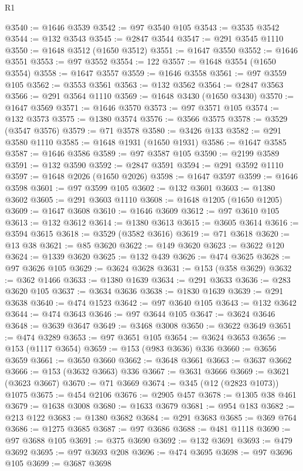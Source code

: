 \begin{lexlean}{R1}
\begin{coremodule}
@3540 := @1646 @3539
@3542 := @97 @3540 @105
@3543 := @3535 @3542
@3544 := @132 @3543
@3545 := @2847 @3544
@3547 := @291 @3545 @1110
@3550 := @1648 @3512 (@1650 @3512)
@3551 := @1647 @3550
@3552 := @1646 @3551
@3553 := @97 @3552
@3554 := 122
@3557 := @1648 @3554 (@1650 @3554)
@3558 := @1647 @3557
@3559 := @1646 @3558
@3561 := @97 @3559 @105
@3562 := @3553 @3561
@3563 := @132 @3562
@3564 := @2847 @3563
@3566 := @291 @3564 @1110
@3569 := @1648 @3430 (@1650 @3430)
@3570 := @1647 @3569
@3571 := @1646 @3570
@3573 := @97 @3571 @105
@3574 := @132 @3573
@3575 := @1380 @3574
@3576 := @3566 @3575
@3578 := @3529 (@3547 @3576)
@3579 := @71 @3578
@3580 := @3426 @133
@3582 := @291 @3580 @1110
@3585 := @1648 @1931 (@1650 @1931)
@3586 := @1647 @3585
@3587 := @1646 @3586
@3589 := @97 @3587 @105
@3590 := @2199 @3589
@3591 := @132 @3590
@3592 := @2847 @3591
@3594 := @291 @3592 @1110
@3597 := @1648 @2026 (@1650 @2026)
@3598 := @1647 @3597
@3599 := @1646 @3598
@3601 := @97 @3599 @105
@3602 := @132 @3601
@3603 := @1380 @3602
@3605 := @291 @3603 @1110
@3608 := @1648 @1205 (@1650 @1205)
@3609 := @1647 @3608
@3610 := @1646 @3609
@3612 := @97 @3610 @105
@3613 := @132 @3612
@3614 := @1380 @3613
@3615 := @3605 @3614
@3616 := @3594 @3615
@3618 := @3529 (@3582 @3616)
@3619 := @71 @3618
@3620 := @13 @38
@3621 := @85 @3620
@3622 := @149 @3620
@3623 := @3622 @120
@3624 := @1339 @3620
@3625 := @132 @439
@3626 := @474 @3625
@3628 := @97 @3626 @105
@3629 := @3624 @3628
@3631 := @153 (@358 @3629)
@3632 := @362 @1466
@3633 := @1380 @1639
@3634 := @291 @3633
@3636 := @283 @3620 @105
@3637 := @3634 @3636
@3638 := @1830 @1639
@3639 := @291 @3638
@3640 := @474 @1523
@3642 := @97 @3640 @105
@3643 := @132 @3642
@3644 := @474 @3643
@3646 := @97 @3644 @105
@3647 := @3624 @3646
@3648 := @3639 @3647
@3649 := @3468 @3008
@3650 := @3622 @3649
@3651 := @474 @3289
@3653 := @97 @3651 @105
@3654 := @3624 @3653
@3656 := @153 (@1117 @3654)
@3659 := @153 (@983 @3636) @336
@3660 := @3656 @3659
@3661 := @3650 @3660
@3662 := @3648 @3661
@3663 := @3637 @3662
@3666 := @153 (@3632 @3663) @336
@3667 := @3631 @3666
@3669 := @3621 (@3623 @3667)
@3670 := @71 @3669
@3674 := @345 (@12 (@2823 @1073)) @1075
@3675 := @454 @2106
@3676 := @2905 @457
@3678 := @1305 @38 @461
@3679 := @1638 @3008
@3680 := @1633 @3679
@3681 := @954 @183
@3682 := @213 @122
@3683 := @1380 @3682
@3684 := @291 @3683
@3685 := @369 @764
@3686 := @1275 @3685
@3687 := @97 @3686
@3688 := @481 @1118
@3690 := @97 @3688 @105
@3691 := @375 @3690
@3692 := @132 @3691
@3693 := @479 @3692
@3695 := @97 @3693 @208
@3696 := @474 @3695
@3698 := @97 @3696 @105
@3699 := @3687 @3698

\end{coremodule}
\end{lexlean}
